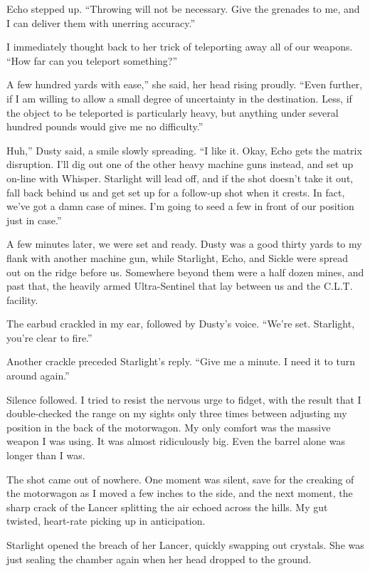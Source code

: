 Echo stepped up. “Throwing will not be necessary. Give the grenades to me, and I can deliver them with unerring accuracy.”

I immediately thought back to her trick of teleporting away all of our weapons. “How far can you teleport something?”

\leavevmode{}A few hundred yards with ease,” she said, her head rising proudly. “Even further, if I am willing to allow a small degree of uncertainty in the destination. Less, if the object to be teleported is particularly heavy, but anything under several hundred pounds would give me no difficulty.”

\leavevmode{}Huh,” Dusty said, a smile slowly spreading. “I like it. Okay, Echo gets the matrix disruption. I’ll dig out one of the other heavy machine guns instead, and set up on-line with Whisper. Starlight will lead off, and if the shot doesn’t take it out, fall back behind us and get set up for a follow-up shot when it crests. In fact, we’ve got a damn case of mines. I’m going to seed a few in front of our position just in case.”

A few minutes later, we were set and ready. Dusty was a good thirty yards to my flank with another machine gun, while Starlight, Echo, and Sickle were spread out on the ridge before us. Somewhere beyond them were a half dozen mines, and past that, the heavily armed Ultra-Sentinel that lay between us and the C.L.T. facility.

The earbud crackled in my ear, followed by Dusty’s voice. “We’re set. Starlight, you’re clear to fire.”

Another crackle preceded Starlight’s reply. “Give me a minute. I need it to turn around again.”

Silence followed. I tried to resist the nervous urge to fidget, with the result that I double-checked the range on my sights only three times between adjusting my position in the back of the motorwagon. My only comfort was the massive weapon I was using. It was almost ridiculously big. Even the barrel alone was longer than I was.

The shot came out of nowhere. One moment was silent, save for the creaking of the motorwagon as I moved a few inches to the side, and the next moment, the sharp crack of the Lancer splitting the air echoed across the hills. My gut twisted, heart-rate picking up in anticipation.

Starlight opened the breach of her Lancer, quickly swapping out crystals. She was just sealing the chamber again when her head dropped to the ground.

